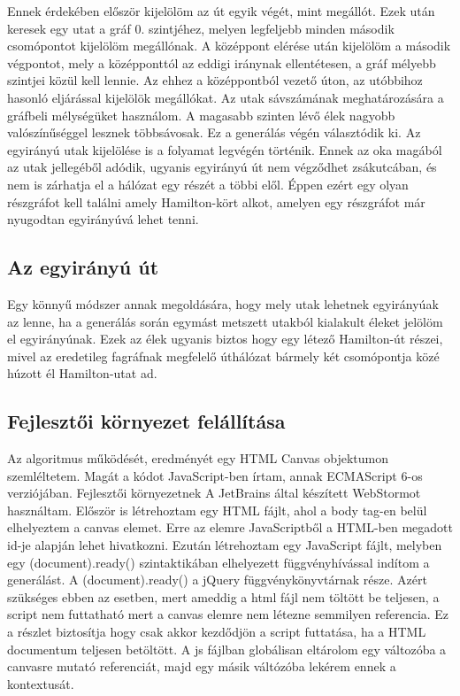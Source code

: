 Ennek érdekében először kijelölöm az út egyik végét, mint megállót. Ezek után keresek egy utat a gráf 0. szintjéhez, melyen legfeljebb minden második csomópontot kijelölöm megállónak. A középpont 
elérése után kijelölöm a második végpontot, mely a középponttól az eddigi iránynak ellentétesen, a gráf mélyebb szintjei közül kell lennie. Az ehhez a középpontból vezető úton, az utóbbihoz hasonló 
eljárással kijelölök megállókat. Az utak sávszámának meghatározására a gráfbeli mélységüket használom. A magasabb szinten lévő élek nagyobb valószínűséggel lesznek többsávosak. Ez a generálás végén választódik
ki. Az egyirányú utak kijelölése is a folyamat legvégén történik. Ennek az oka magából az utak jellegéből adódik, ugyanis egyirányú út nem végződhet zsákutcában, és nem is zárhatja el a hálózat egy részét a többi elől. Éppen ezért egy olyan részgráfot kell találni amely Hamilton-kört alkot, amelyen egy részgráfot már nyugodtan egyirányúvá lehet tenni.
\subsection{Az egyirányú út}
Egy könnyű módszer annak megoldására, hogy mely utak lehetnek egyirányúak az lenne, ha a generálás során egymást metszett utakból kialakult éleket jelölöm el egyirányúnak. Ezek az élek ugyanis biztos hogy egy létező Hamilton-út részei, mivel az eredetileg fagráfnak megfelelő úthálózat bármely két csomópontja közé húzott él Hamilton-utat ad.
\subsection{Fejlesztői környezet felállítása}
Az algoritmus működését, eredményét egy HTML Canvas objektumon szemléltetem. Magát a kódot JavaScript-ben írtam, annak ECMAScript 6-os verziójában. Fejlesztői környezetnek A JetBrains által készített WebStormot használtam. Először is 
létrehoztam egy HTML fájlt, ahol a body tag-en belül elhelyeztem a canvas elemet. Erre az elemre JavaScriptből a HTML-ben megadott id-je alapján lehet hivatkozni. Ezután létrehoztam egy JavaScript fájlt, melyben egy (document).ready() szintaktikában 
elhelyezett függvényhívással indítom a generálást. A (document).ready() a jQuery függvénykönyvtárnak része. Azért szükséges ebben az esetben, mert ameddig a html fájl nem töltött be teljesen, a script nem futtatható mert a canvas elemre nem létezne 
semmilyen referencia. Ez a részlet biztosítja hogy csak akkor kezdődjön a script futtatása, ha a HTML documentum teljesen betöltött. A js fájlban globálisan eltárolom egy változóba a canvasre mutató referenciát, majd egy másik váltózóba lekérem ennek a kontextusát.
